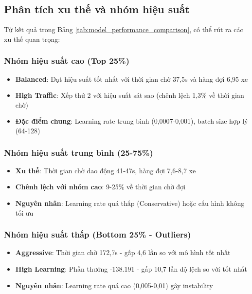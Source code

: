 \subsection{Phân tích xu thế và nhóm hiệu suất}

Từ kết quả trong Bảng \ref{tab:model_performance_comparison}, có thể rút ra các xu thế quan trọng:

\subsubsection{Nhóm hiệu suất cao (Top 25\%)}
\begin{itemize}
    \item \textbf{Balanced}: Đạt hiệu suất tốt nhất với thời gian chờ 37,5s và hàng đợi 6,95 xe
    \item \textbf{High Traffic}: Xếp thứ 2 với hiệu suất sát sao (chênh lệch 1,3\% về thời gian chờ)
    \item \textbf{Đặc điểm chung}: Learning rate trung bình (0,0007-0,001), batch size hợp lý (64-128)
\end{itemize}

\subsubsection{Nhóm hiệu suất trung bình (25-75\%)}
\begin{itemize}
    \item \textbf{Xu thế}: Thời gian chờ dao động 41-47s, hàng đợi 7,6-8,7 xe
    \item \textbf{Chênh lệch với nhóm cao}: 9-25\% về thời gian chờ đợi
    \item \textbf{Nguyên nhân}: Learning rate quá thấp (Conservative) hoặc cấu hình không tối ưu
\end{itemize}

\subsubsection{Nhóm hiệu suất thấp (Bottom 25\% - Outliers)}
\begin{itemize}
    \item \textbf{Aggressive}: Thời gian chờ 172,7s - gấp 4,6 lần so với mô hình tốt nhất
    \item \textbf{High Learning}: Phần thưởng -138.191 - gấp 10,7 lần độ lệch so với tốt nhất
    \item \textbf{Nguyên nhân}: Learning rate quá cao (0,005-0,01) gây instability
\end{itemize}

